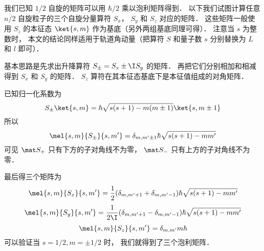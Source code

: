 

我们已知 $1/2$ 自旋的矩阵可以用 $\hbar/2$ 乘以泡利矩阵得到． 以下我们试图计算任意 $n/2$ 自旋粒子的三个自旋分量算符 $S_x$， $S_y$ 和 $S_z$ 对应的矩阵． 这些矩阵一般使用 $S_z$ 的本征态 $\ket{s, m}$ 作为基底（另外两组基底同理可得）． 注意当 $s$ 为整数时， 本文的结论同样适用于轨道角动量（把算符 $S$ 和量子数 $s$ 分别替换为 $L$ 和 $l$ 即可）．

基本思路是先求出升降算符 $S_\pm = S_x \pm \I S_y$ 的矩阵． 再把它们分别相加和相减得到 $S_x$ 和 $S_y$ 的矩阵． $S_z$ 算符在其本征态基底下是本征值组成的对角矩阵．

已知归一化系数为
\begin{equation}
S_\pm \ket{s,m} = \hbar \sqrt{s(s + 1) - m(m \pm 1)} \ket{s,m\pm1}
\end{equation}
所以
\begin{equation}
\mel{s,m}{S_\pm}{s,m'} = \delta_{m, m'\pm1} \hbar \sqrt{s(s + 1) - mm'}
\end{equation}
可见 $\mat S_+$ 只有下方的子对角线不为零， $\mat S_-$ 只有上方的子对角线不为零．

最后得三个矩阵为
\begin{equation}
\mel{s,m}{S_x}{s,m'} = \frac12(\delta_{m, m'+1} + \delta_{m, m'-1})\hbar \sqrt{s(s + 1) - mm'} 
\end{equation}
\begin{equation}
\mel{s,m}{S_y}{s,m'} = \frac{1}{2\I}(\delta_{m, m'+1} - \delta_{m, m'-1}) \hbar \sqrt{s(s + 1) - mm'}
\end{equation}
\begin{equation}
\mel{s,m}{S_z}{s,m'} = \delta_{m,m'} m\hbar 
\end{equation}
可以验证当 $s = 1/2, m = \pm1/2$ 时， 我们就得到了三个泡利矩阵．
